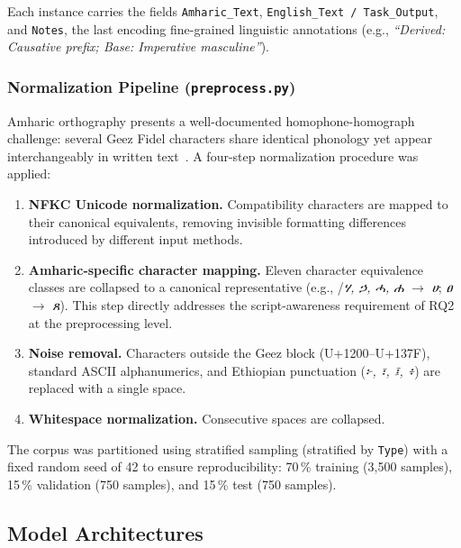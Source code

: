 Each instance carries the fields \texttt{Amharic\_Text}, \texttt{English\_Text / Task\_Output},
and \texttt{Notes}, the last encoding fine-grained linguistic annotations (e.g.,
\emph{``Derived: Causative prefix; Base: Imperative masculine''}).

\subsubsection{Normalization Pipeline (\texttt{preprocess.py})}

Amharic orthography presents a well-documented homophone-homograph challenge: several
Ge\textquotesingle ez Fidel characters share identical phonology yet appear interchangeably in
written text~\cite{gasser2010,gezahen2015}.  A four-step normalization procedure was applied:

\begin{enumerate}
  \item \textbf{NFKC Unicode normalization.}  Compatibility characters are mapped to their
        canonical equivalents, removing invisible formatting differences introduced by different
        input methods.
  \item \textbf{Amharic-specific character mapping.}  Eleven character equivalence classes are
        collapsed to a canonical representative
        (e.g., \textipa{\textglotstop}/\textit{ሃ, ኃ, ሓ, ሐ} $\rightarrow$ \textit{ሀ};
        \textit{ፀ} $\rightarrow$ \textit{ጸ}).  This step directly addresses the
        script-awareness requirement of RQ2 at the preprocessing level.
  \item \textbf{Noise removal.}  Characters outside the Ge\textquotesingle ez block
        (U+1200--U+137F), standard ASCII alphanumerics, and Ethiopian punctuation
        (\textit{፦, ፣, ፤, ፥}) are replaced with a single space.
  \item \textbf{Whitespace normalization.}  Consecutive spaces are collapsed.
\end{enumerate}

The corpus was partitioned using stratified sampling (stratified by \texttt{Type}) with a fixed
random seed of 42 to ensure reproducibility: 70\,\% training (3{,}500 samples), 15\,\%
validation (750 samples), and 15\,\% test (750 samples).

\subsection{Model Architectures}
\label{sec:models}

